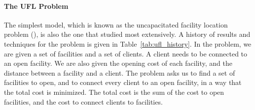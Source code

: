 \documentclass[oneside,final]{ucr}
\begin{document}
\paragraph{The UFL Problem}
The simplest model, which is known as the uncapacitated
facility location problem ({\UFL}), is also the one that
studied most extensively. A history of results and
techniques for the {\UFL} problem is given in
Table~\ref{tab:ufl_history}. In the {\UFL} problem, we are
given a set of facilities and a set of clients. A client
needs to be connected to an open facility. We are also given
the opening cost of each facility, and the distance between
a facility and a client. The problem asks us to find a set
of facilities to open, and to connect every client to an
open facility, in a way that the total cost is
minimized. The total cost is the sum of the cost to open
facilities, and the cost to connect clients to facilities.
\end{document}
